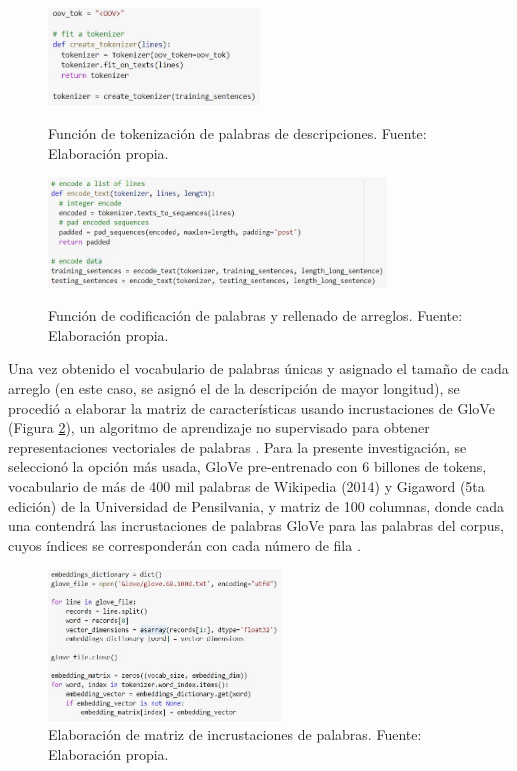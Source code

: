 \begin{figure}[htbp]
	\begin{center}
		\includegraphics[width=0.50\textwidth]{4/figures/description_tokenizer_function.jpg}
		\caption{Función de tokenización de palabras de descripciones. Fuente: Elaboración propia.}
		\label{4:fig36}
		\includegraphics[width=0.80\textwidth]{4/figures/description_encoder_function.jpg}
		\caption{Función de codificación de palabras y rellenado de arreglos. Fuente: Elaboración propia.}
		\label{4:fig37}
	\end{center}
\end{figure}

Una vez obtenido el vocabulario de palabras únicas y asignado el tamaño de cada arreglo (en este caso, se asignó el de la descripción de mayor longitud), se procedió a elaborar la matriz de características usando incrustaciones de GloVe (Figura \ref{4:fig38}), un algoritmo de aprendizaje no supervisado para obtener representaciones vectoriales de palabras \parencite{gl_pennington_glove}. Para la presente investigación, se seleccionó la opción más usada, GloVe pre-entrenado con 6 billones de tokens, vocabulario de más de 400 mil palabras de Wikipedia (2014) y Gigaword (5ta edición) de la Universidad de Pensilvania, y matriz de 100 columnas, donde cada una contendrá las incrustaciones de palabras GloVe para las palabras del corpus, cuyos índices se corresponderán con cada número de fila \parencite{tec_malik2019pythonnlp}.

\begin{figure}[!ht]
	\begin{center}
		\includegraphics[width=0.55\textwidth]{4/figures/description_glove.jpg}
		\caption{Elaboración de matriz de incrustaciones de palabras. Fuente: Elaboración propia.}
		\label{4:fig38}
	\end{center}
\end{figure}

